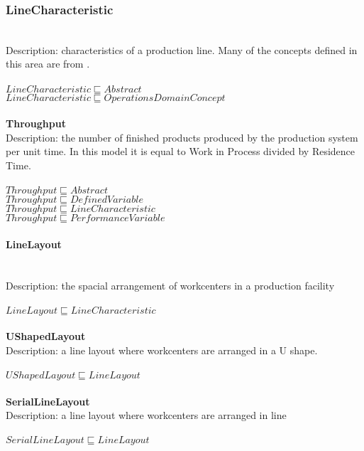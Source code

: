 \subsubsection{LineCharacteristic}\\
Description: characteristics of a production line. Many of the concepts defined in this area are from \cite{Boysen2008}.\\
\\$ LineCharacteristic \sqsubseteq Abstract$
\\$ LineCharacteristic \sqsubseteq OperationsDomainConcept$
\\\\   \textbf{Throughput}\\Description: the number of finished products produced by the production system per unit time. In this model it is equal to Work in Process divided by Residence Time.\\
\\$ Throughput \sqsubseteq Abstract$
\\$ Throughput \sqsubseteq DefinedVariable$
\\$ Throughput \sqsubseteq LineCharacteristic$
\\$ Throughput \sqsubseteq PerformanceVariable$
\paragraph{LineLayout}\\
Description: the spacial arrangement of workcenters in a production facility\\
\\$ LineLayout \sqsubseteq LineCharacteristic$
\\\\   \textbf{UShapedLayout}\\Description: a line layout where workcenters are arranged in a U shape.\\
\\$ UShapedLayout \sqsubseteq LineLayout$
\\\\   \textbf{SerialLineLayout}\\Description: a line layout where workcenters are arranged in line\\
\\$ SerialLineLayout \sqsubseteq LineLayout$
